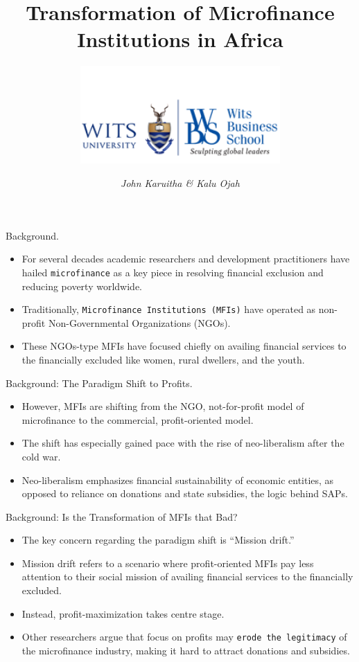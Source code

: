 \documentclass[
  ignorenonframetext,
]{beamer}
\title{\textbf{Transformation of Microfinance Institutions in Africa}}
\subtitle{\includegraphics[width=3in,height=\textheight]{logo_wits.png}}
\author{\emph{John Karuitha \& Kalu Ojah}}
\date{}
\begin{document}
\frame{\titlepage}

\begin{frame}[fragile]{Background.}
\protect\hypertarget{background.}{}
\begin{itemize}
\item
  For several decades academic researchers and development practitioners
  have hailed \texttt{microfinance} as a key piece in resolving
  financial exclusion and reducing poverty worldwide.
\item
  Traditionally, \texttt{Microfinance\ Institutions\ (MFIs)} have
  operated as non-profit Non-Governmental Organizations (NGOs).
\item
  These NGOs-type MFIs have focused chiefly on availing financial
  services to the financially excluded like women, rural dwellers, and
  the youth.
\end{itemize}
\end{frame}

\begin{frame}{Background: The Paradigm Shift to Profits.}
\protect\hypertarget{background-the-paradigm-shift-to-profits.}{}
\begin{itemize}
\item
  However, MFIs are shifting from the NGO, not-for-profit model of
  microfinance to the commercial, profit-oriented model.
\item
  The shift has especially gained pace with the rise of neo-liberalism
  after the cold war.
\item
  Neo-liberalism emphasizes financial sustainability of economic
  entities, as opposed to reliance on donations and state subsidies, the
  logic behind SAPs.
\end{itemize}
\end{frame}

\begin{frame}[fragile]{Background: Is the Transformation of MFIs that
Bad?}
\protect\hypertarget{background-is-the-transformation-of-mfis-that-bad}{}
\begin{itemize}
\item
  The key concern regarding the paradigm shift is ``Mission drift.''
\item
  Mission drift refers to a scenario where profit-oriented MFIs pay less
  attention to their social mission of availing financial services to
  the financially excluded.
\item
  Instead, profit-maximization takes centre stage.
\item
  Other researchers argue that focus on profits may
  \texttt{erode\ the\ legitimacy} of the microfinance industry, making
  it hard to attract donations and subsidies.
\end{itemize}
\end{frame}
\end{document}
